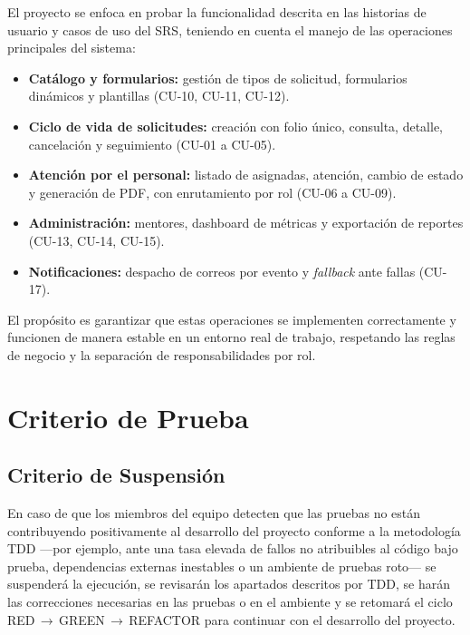 \documentclass[12pt,letterpaper]{report}
\begin{document}
El proyecto se enfoca en probar la funcionalidad descrita en las historias de
usuario y casos de uso del SRS, teniendo en cuenta el manejo de las operaciones
principales del sistema:

\begin{itemize}[leftmargin=*]
  \item \textbf{Catálogo y formularios:} gestión de tipos de solicitud,
  formularios dinámicos y plantillas (CU-10, CU-11, CU-12).
  \item \textbf{Ciclo de vida de solicitudes:} creación con folio único,
  consulta, detalle, cancelación y seguimiento (CU-01 a CU-05).
  \item \textbf{Atención por el personal:} listado de asignadas, atención,
  cambio de estado y generación de PDF, con enrutamiento por rol (CU-06 a
  CU-09).
  \item \textbf{Administración:} mentores, dashboard de métricas y exportación
  de reportes (CU-13, CU-14, CU-15).
  \item \textbf{Notificaciones:} despacho de correos por evento y
  \emph{fallback} ante fallas (CU-17).
\end{itemize}

El propósito es garantizar que estas operaciones se implementen correctamente y
funcionen de manera estable en un entorno real de trabajo, respetando las reglas
de negocio y la separación de responsabilidades por rol.

\chapter{Criterio de Prueba}

\section{Criterio de Suspensión}

En caso de que los miembros del equipo detecten que las pruebas no están
contribuyendo positivamente al desarrollo del proyecto conforme a la metodología
TDD —por ejemplo, ante una tasa elevada de fallos no atribuibles al código bajo
prueba, dependencias externas inestables o un ambiente de pruebas roto— se
suspenderá la ejecución, se revisarán los apartados descritos por TDD, se harán
las correcciones necesarias en las pruebas o en el ambiente y se retomará el
ciclo RED\,$\rightarrow$\,GREEN\,$\rightarrow$\,REFACTOR para continuar con el
desarrollo del proyecto.
\end{document}
